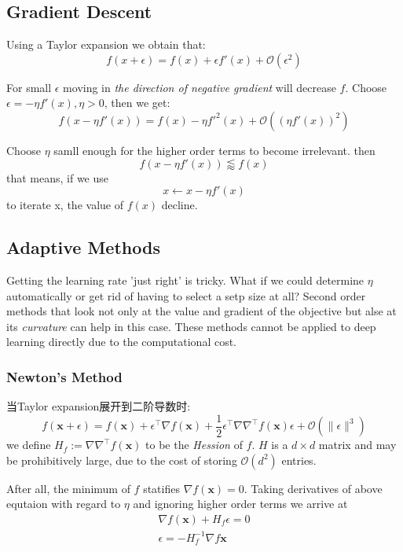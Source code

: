 \subsection{Gradient Descent}
Using a Taylor expansion we obtain that:
\begin{equation}
    f(x + \epsilon) = f(x) + \epsilon f'(x) + \mathcal{O} (\epsilon^2)
\end{equation}
\par
For small $\epsilon$ moving in \textit{the direction of negative gradient} will decrease $f$. Choose $\epsilon = 
-\eta f'(x), \eta > 0$, then we get:
\begin{equation}
    f(x - \eta f'(x)) = f(x) - \eta f'^2(x) + \mathcal{O} ((\eta f'(x))^2)
\end{equation}
\par Choose $\eta$ samll enough for the higher order terms to become irrelevant. then
\begin{equation}
    f(x - \eta f'(x)) \lessapprox f(x)
\end{equation}
that means, if we use 
\begin{equation}
    x \leftarrow x - \eta f'(x)
\end{equation}
to iterate x, the value of $f(x)$ decline.

\subsection{Adaptive Methods}
Getting the learning rate 'just right' is tricky. What if we could determine $\eta$ automatically or get rid of having to select
a setp size at all? Second order methods that look not only at the value and gradient of the objective but alse at its \textit{curvature}
can help in this case. These methods cannot be applied to deep learning directly due to the computational cost.

\subsubsection{Newton's Method}
当Taylor expansion展开到二阶导数时:
\begin{equation}
    f(\mathbf{x} + \epsilon) = f(\mathbf{x}) + \epsilon^\top \nabla f(\mathbf{x}) + \frac{1}{2} \epsilon^\top \nabla\nabla^\top f(\mathbf{x}) \epsilon 
    + \mathcal{O}(\|\epsilon\|^3)
\end{equation}
we define $H_f := \nabla \nabla ^\top f(\mathbf{x})$ to be the \textit{Hession} of $f$. $H$ is a $d \times  d$ matrix and may be
prohibitively large, due to the cost of storing $\mathcal{O}(d^2)$ entries.

\par

After all, the minimum of $f$ statifies $\nabla f(\mathbf{x}) = 0$.  Taking derivatives of above equtaion with regard to $\eta$ and 
ignoring higher order terms we arrive at 
\begin{equation}
   \begin{split}
    \nabla f(\mathbf{x}) + H_f \epsilon = 0 \\
    \epsilon = -H_f^{-1} \nabla f{\mathbf{x}}
   \end{split}
\end{equation}